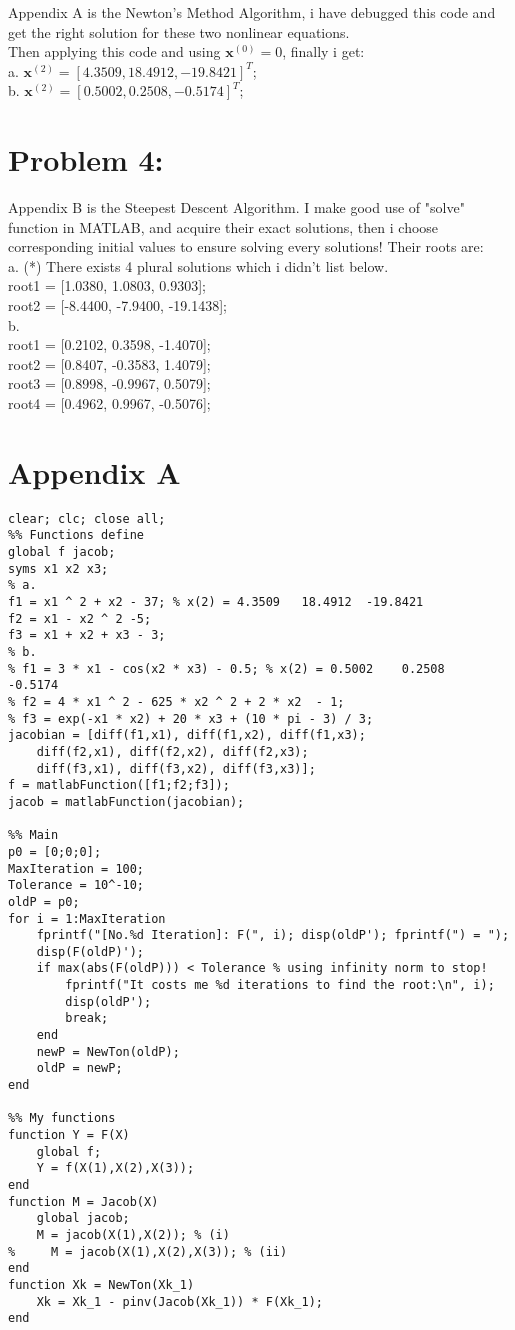 \documentclass{article}
\begin{document}
Appendix A is the Newton's Method Algorithm, i have debugged this code and get the right solution for these two nonlinear equations.\\
Then applying this code and using $\textbf{x}^{(0)}=0$, finally i get: \\
a. $\textbf{x}^{(2)}=[4.3509, 18.4912, -19.8421]^T$; \\
b. $\textbf{x}^{(2)}=[0.5002, 0.2508, -0.5174]^T$;

\section{Problem 4:} 
Appendix B is the Steepest Descent Algorithm. I make good use of "solve" function in MATLAB, and acquire their exact solutions, then i choose corresponding initial values to ensure solving every solutions! Their roots are: \\
a. (*) There exists 4 plural solutions which i didn't list below. \\
root1 = [1.0380, 1.0803, 0.9303]; \\
root2 = [-8.4400, -7.9400, -19.1438]; \\
b. \\
root1 = [0.2102, 0.3598, -1.4070]; \\
root2 = [0.8407, -0.3583, 1.4079]; \\
root3 = [0.8998, -0.9967, 0.5079]; \\
root4 = [0.4962, 0.9967, -0.5076]; \\
	 

\newpage
\appendix
\section{Appendix A}

\begin{lstlisting}
clear; clc; close all;
%% Functions define
global f jacob;
syms x1 x2 x3;
% a.
f1 = x1 ^ 2 + x2 - 37; % x(2) = 4.3509   18.4912  -19.8421
f2 = x1 - x2 ^ 2 -5;
f3 = x1 + x2 + x3 - 3;
% b.
% f1 = 3 * x1 - cos(x2 * x3) - 0.5; % x(2) = 0.5002    0.2508   -0.5174
% f2 = 4 * x1 ^ 2 - 625 * x2 ^ 2 + 2 * x2  - 1;
% f3 = exp(-x1 * x2) + 20 * x3 + (10 * pi - 3) / 3;
jacobian = [diff(f1,x1), diff(f1,x2), diff(f1,x3);
    diff(f2,x1), diff(f2,x2), diff(f2,x3);
    diff(f3,x1), diff(f3,x2), diff(f3,x3)];
f = matlabFunction([f1;f2;f3]);
jacob = matlabFunction(jacobian);

%% Main
p0 = [0;0;0];
MaxIteration = 100;
Tolerance = 10^-10;
oldP = p0;
for i = 1:MaxIteration
    fprintf("[No.%d Iteration]: F(", i); disp(oldP'); fprintf(") = ");
    disp(F(oldP)');
    if max(abs(F(oldP))) < Tolerance % using infinity norm to stop!
        fprintf("It costs me %d iterations to find the root:\n", i);
        disp(oldP');
        break;
    end
    newP = NewTon(oldP);
    oldP = newP;
end

%% My functions
function Y = F(X)
    global f;
    Y = f(X(1),X(2),X(3));
end
function M = Jacob(X)
    global jacob;
    M = jacob(X(1),X(2)); % (i)
%     M = jacob(X(1),X(2),X(3)); % (ii)
end
function Xk = NewTon(Xk_1)
    Xk = Xk_1 - pinv(Jacob(Xk_1)) * F(Xk_1);
end
\end{lstlisting}
\end{document}
